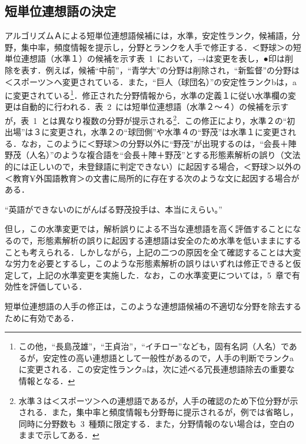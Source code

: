 \subsection{短単位連想語の決定}
\vspace{-1mm}
アルゴリズムＡによる短単位連想語候補には，水準，安定性ランク，候補語，分野，集中率，頻度情報を提示し，分野とランクを人手で修正する．＜野球＞の短単位連想語（水準１）の候補\mbox{を示す表~1~において}，→は変更を表し，●印は削除を表す．例えば，候補``中前''，\mbox{``青学大''の}分野は削除され，``新監督''の分野は＜スポーツ＞へ変更されている．また，\mbox{``巨人（球団名）''の}安定性ランクbは，aに変更されている\footnote{この他，``長島茂雄''，``王貞治''，``イチロー''なども，固有名詞（人名）であるが，安定性の高い連想語として一般性があるので，人手の判断でランクaに変更される．この安定性ランクaは，次に述べる冗長連想語除去の重要な情報となる．}．修正された分野情報から，水準の定義１に従い水準欄の変更は自動的に行われる．表~2~には短単位連想語（水準２〜４）の候補を示すが，表~1~とは異なり複数の分野が提示される\footnote{水準３は＜スポーツ＞への連想語であるが，人手の確認のため下位分野が示される．また，集中率と頻度情報も分野毎に提示されるが，例では省略し，同時に分野数も~3~種類に限定する．また，分野情報のない場合は，空白のままで示してある．}．この修正により，水準２の``初出場''は３に変更され，水準２の``球団側''や水準４の``野茂''は水準１に変更される．なお，このように＜野球＞の分野以外に``野茂''が出現するのは，``会長＋陣野茂（人名）''のような複合語を``会長＋陣＋野茂''とする形態素解析の誤り（文法的には正しいので，未登録語に判定できない）に起因する場合，＜野球＞以外の＜教育¥外国語教育＞の文書に局所的に存在する次のような文に起因する場合がある．
\begin{center}
``英語ができないのにがんばる野茂投手は、本当にえらい。''
\end{center}

但し，この水準変更では，解析誤りによる不当な連想語を高く評価することになるので，形態素解析の誤りに起因する連想語は安全のため水準を低いままにすることも考えられる．しかしながら，上記の二つの原因を全て確認することは大変な労力を必要とするし，このような形態素解析の誤りはいずれは修正できると仮定して，上記の水準変更を実施した．なお，この水準変更については，5~章で有効性を評価している．

短単位連想語の人手の修正は，このような連想語候補の不適切な分野を除去するために有効である．

